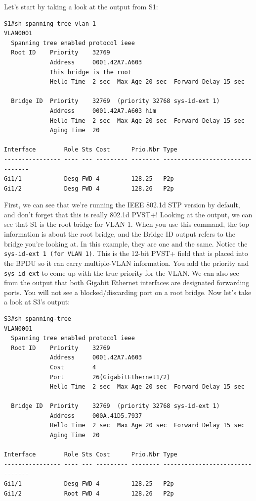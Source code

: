 Let's start by taking a look at the output from S1:

\begin{verbatim}
S1#sh spanning-tree vlan 1
VLAN0001
  Spanning tree enabled protocol ieee
  Root ID    Priority    32769
             Address     0001.42A7.A603
             This bridge is the root
             Hello Time  2 sec  Max Age 20 sec  Forward Delay 15 sec
 
  Bridge ID  Priority    32769  (priority 32768 sys-id-ext 1)
             Address     0001.42A7.A603 him
             Hello Time  2 sec  Max Age 20 sec  Forward Delay 15 sec
             Aging Time  20
 
Interface        Role Sts Cost      Prio.Nbr Type
---------------- ---- --- --------- -------- --------------------------------
Gi1/1            Desg FWD 4         128.25   P2p
Gi1/2            Desg FWD 4         128.26   P2p
\end{verbatim}

First, we can see that we're running the IEEE 802.1d STP version by
default, and don't forget that this is really 802.1d PVST+! Looking at
the output, we can see that S1 is the root bridge for VLAN 1. When you
use this command, the top information is about the root bridge, and the
Bridge ID output refers to the bridge you're looking at. In this
example, they are one and the same. Notice the
\texttt{sys-id-ext\ 1\ (for\ VLAN\ 1)}. This is the 12-bit PVST+ field
that is placed into the BPDU so it can carry multiple-VLAN information.
You add the priority and \texttt{sys-id-ext} to come up with the true
priority for the VLAN. We can also see from the output that both Gigabit
Ethernet interfaces are designated forwarding ports. You will not see a
blocked/discarding port on a root bridge. Now let's take a look at S3's
output:

\begin{verbatim}
S3#sh spanning-tree
VLAN0001
  Spanning tree enabled protocol ieee
  Root ID    Priority    32769
             Address     0001.42A7.A603
             Cost        4
             Port        26(GigabitEthernet1/2)
             Hello Time  2 sec  Max Age 20 sec  Forward Delay 15 sec
 
  Bridge ID  Priority    32769  (priority 32768 sys-id-ext 1)
             Address     000A.41D5.7937
             Hello Time  2 sec  Max Age 20 sec  Forward Delay 15 sec
             Aging Time  20
 
Interface        Role Sts Cost      Prio.Nbr Type
---------------- ---- --- --------- -------- --------------------------------
Gi1/1            Desg FWD 4         128.25   P2p
Gi1/2            Root FWD 4         128.26   P2p
\end{verbatim}


